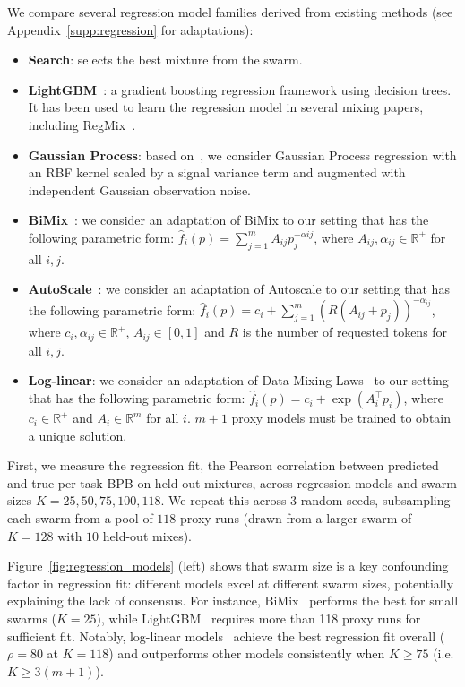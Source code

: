 \documentclass[table]{ai2style/ai2}
\newcommand{\R}[0]{\mathbb{R}}
\begin{document}
We compare several regression model families derived from existing methods (see Appendix~\ref{supp:regression} for adaptations):
\begin{itemize}[itemsep=0.00pt,topsep=0pt,leftmargin=10pt]
    \item \textbf{Search}: selects the best mixture from the swarm.
    \item \textbf{LightGBM}~\citep{lightgbm}: a gradient boosting regression framework using decision trees. It has been used to learn the regression model in several mixing papers, including RegMix~\citep{liu2025regmixdatamixtureregression, wettig2025organizewebconstructingdomains, diao2025climbclusteringbasediterativedata}.
    \item \textbf{Gaussian Process}: based on~\cite{chen2025admirebayesoptaccelerateddatamixture}, we consider Gaussian Process regression with an RBF kernel scaled by a signal variance term and augmented with independent Gaussian observation noise.
    \item \textbf{BiMix}~\citep{ge2025bimixbivariatedatamixing}: we consider an adaptation of BiMix to our setting that has the following parametric form: $\hat{f}_i(p) = \sum_{j = 1}^m A_{ij} p_j^{-\alpha{ij}}$, where $A_{ij}, \alpha_{ij} \in \R^+$ for all $i, j$. 
    \item \textbf{AutoScale}~\citep{kang2025autoscalescaleawaredatamixing}: we consider an adaptation of Autoscale to our setting that has the following parametric form: $\hat{f}_i(p) = c_i + \sum_{j = 1}^m (R(A_{ij} + p_j))^{-\alpha_{ij}}$, where $c_i, \alpha_{ij} \in \R^+$, $A_{ij} \in [0, 1]$ and $R$ is the number of requested tokens for all $i, j$. 
    \item \textbf{Log-linear}: we consider an adaptation of Data Mixing Laws~\citep{ye2025datamixinglawsoptimizing} to our setting that has the following parametric form: $\hat{f}_i(p) = c_i + \exp(A_i^\top p_i)$, where $c_i \in \R^+$ and $A_i \in \R^m$ for all $i$. $m+1$ proxy models must be trained to obtain a unique solution.
\end{itemize}

First, we measure the regression fit, the Pearson correlation between predicted and true per-task BPB on held-out mixtures, across regression models and swarm sizes $K= 25, 50, 75, 100, 118$. We repeat this across 3 random seeds, subsampling each swarm from a pool of $118$ proxy runs (drawn from a larger swarm of $K=128$ with $10$ held-out mixes).

Figure~\ref{fig:regression_models} (left) shows that swarm size is a key confounding factor in regression fit: different models excel at different swarm sizes, potentially explaining the lack of consensus. For instance, BiMix~\citep{ge2025bimixbivariatedatamixing} performs the best for small swarms ($K=25$), while LightGBM~\citep{liu2025regmixdatamixtureregression} requires more than 118 proxy runs for sufficient fit. Notably, log-linear models~\citep{ye2025datamixinglawsoptimizing} achieve the best regression fit overall ($\rho=80$ at $K=118$) and outperforms other models consistently when  $K \ge 75$ (i.e. $K \ge 3(m+1)$).
\end{document}
